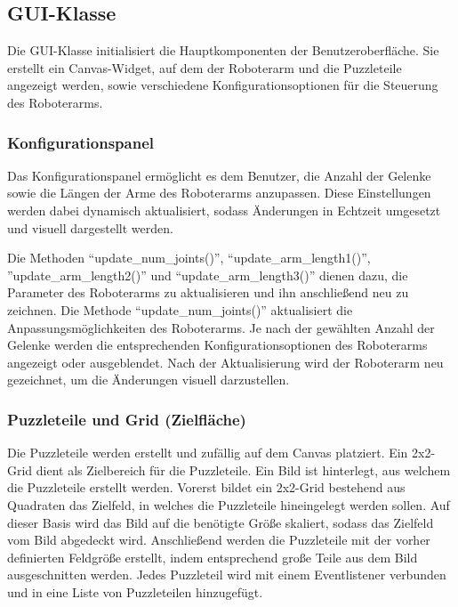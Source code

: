 \documentclass[12pt]{article}
\begin{document}
        \subsection{GUI-Klasse}
            Die GUI-Klasse initialisiert die Hauptkomponenten der Benutzeroberfläche. Sie erstellt ein Canvas-Widget,
            auf dem der Roboterarm und die Puzzleteile angezeigt werden, sowie verschiedene Konfigurationsoptionen für
            die Steuerung des Roboterarms.

            \subsubsection{Konfigurationspanel}
                Das Konfigurationspanel ermöglicht es dem Benutzer, die Anzahl der Gelenke sowie die Längen der Arme
                des Roboterarms anzupassen. Diese Einstellungen werden dabei dynamisch aktualisiert, sodass Änderungen
                in Echtzeit umgesetzt und visuell dargestellt werden.

                Die Methoden “update\_num\_joints()”, “update\_arm\_length1()”,
                ”update\_arm\_length2()” und
                “update\_arm\_length3()” dienen dazu, die Parameter des Roboterarms zu aktualisieren und ihn
                anschließend neu zu zeichnen.
                Die Methode “update\_num\_joints()” aktualisiert die Anpassungsmöglichkeiten des Roboterarms. Je nach
                der gewählten Anzahl der Gelenke werden die entsprechenden Konfigurationsoptionen des Roboterarms
                angezeigt oder ausgeblendet. Nach der Aktualisierung wird der Roboterarm neu gezeichnet, um die
                Änderungen visuell darzustellen.

            \subsubsection{Puzzleteile und Grid (Zielfläche)}
                Die Puzzleteile werden erstellt und zufällig auf dem Canvas platziert. Ein 2x2-Grid dient als
                Zielbereich für die Puzzleteile. Ein Bild ist hinterlegt, aus welchem die Puzzleteile erstellt werden.
                Vorerst bildet ein 2x2-Grid bestehend aus Quadraten das Zielfeld, in welches die Puzzleteile
                hineingelegt werden sollen. Auf dieser Basis wird das Bild auf die benötigte Größe skaliert, sodass
                das Zielfeld vom Bild abgedeckt wird. Anschließend werden die Puzzleteile mit der vorher definierten
                Feldgröße erstellt, indem entsprechend große Teile aus dem Bild ausgeschnitten werden. Jedes
                Puzzleteil wird mit einem Eventlistener verbunden und in eine Liste von Puzzleteilen hinzugefügt.
\end{document}
